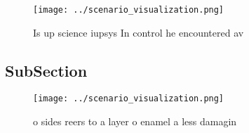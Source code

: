\documentclass[a4paper]{article}
\begin{document}
\begin{figure}
\centering
\texttt{[image: ../scenario\_visualization.png]}
\caption{Is up science iupsys In control he encountered av
}
\end{figure}
 
\subsection{SubSection}

\begin{figure}
\centering
\texttt{[image: ../scenario\_visualization.png]}
\caption{ o sides reers to a layer o enamel a less damagin
}
\end{figure}
 
\end{document}
